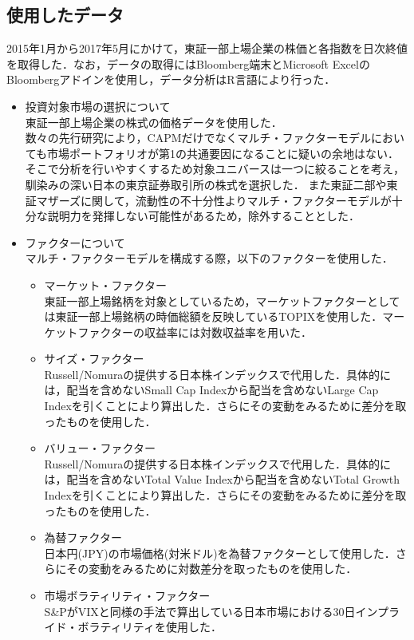 ﻿\documentclass[a4paper]{jarticle}
\begin{document}
\subsection{使用したデータ}
2015年1月から2017年5月にかけて，東証一部上場企業の株価と各指数を日次終値を取得した．なお，データの取得にはBloomberg端末とMicrosoft ExcelのBloombergアドインを使用し，データ分析はR言語により行った．
\begin{itemize}
\item 投資対象市場の選択について\\
\quad 東証一部上場企業の株式の価格データを使用した．\\
\quad 数々の先行研究により，CAPMだけでなくマルチ・ファクターモデルにおいても市場ポートフォリオが第1の共通要因になることに疑いの余地はない．
そこで分析を行いやすくするため対象ユニバースは一つに絞ることを考え，馴染みの深い日本の東京証券取引所の株式を選択した．
また東証二部や東証マザーズに関して，流動性の不十分性よりマルチ・ファクターモデルが十分な説明力を発揮しない可能性があるため，除外することとした．
\item ファクターについて\\
マルチ・ファクターモデルを構成する際，以下のファクターを使用した．
\begin{itemize}
\item マーケット・ファクター\\
東証一部上場銘柄を対象としているため，マーケットファクターとしては東証一部上場銘柄の時価総額を反映しているTOPIXを使用した．マーケットファクターの収益率には対数収益率を用いた．
\item サイズ・ファクター\\
Russell/Nomuraの提供する日本株インデックスで代用した．具体的には，配当を含めないSmall Cap Indexから配当を含めないLarge Cap Indexを引くことにより算出した．さらにその変動をみるために差分を取ったものを使用した．
\item バリュー・ファクター\\
Russell/Nomuraの提供する日本株インデックスで代用した．具体的には，配当を含めないTotal Value Indexから配当を含めないTotal Growth Indexを引くことにより算出した．さらにその変動をみるために差分を取ったものを使用した．
\item 為替ファクター\\
日本円(JPY)の市場価格(対米ドル)を為替ファクターとして使用した．さらにその変動をみるために対数差分を取ったものを使用した．
\item 市場ボラティリティ・ファクター\\
S\&PがVIXと同様の手法で算出している日本市場における30日インプライド・ボラティリティを使用した．

\end{itemize}
\end{itemize}
\end{document}
